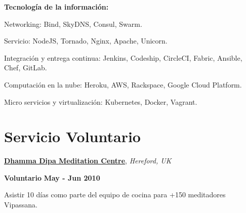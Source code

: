\textbf{Tecnolog\'ia de la informaci\'on:} 
    \begin{innerlist}
\item Networking: Bind, SkyDNS, Consul, Swarm.
\item Servicio: NodeJS, Tornado, Nginx, Apache, Unicorn.
\item Integraci\'on y entrega continua: Jenkins, Codeship, CircleCI,
Fabric, Ansible, Chef, GitLab.
\item Computaci\'on en la nube: Heroku, AWS, Rackspace, Google Cloud Platform.
\item Micro servicios y virtualización: Kubernetes, Docker, Vagrant.
    \end{innerlist}

% 
% 
% 
% 
% 
% 
% 
% 
% 
% 

\section{Servicio Voluntario}
%
\href{http://www.dipa.dhamma.org/}{\textbf{Dhamma
Dipa Meditation Centre}}, \textit{Hereford, UK}
%
\begin{outerlist}
\item[\FA \faAngleDoubleRight] \textbf{Voluntario}%
        \hfill \textbf{May - Jun 2010}
\end{outerlist}

\begin{innerlist}
\item Asistir 10 días como parte del equipo de cocina para +150
meditadores Vipassana.
\end{innerlist}


